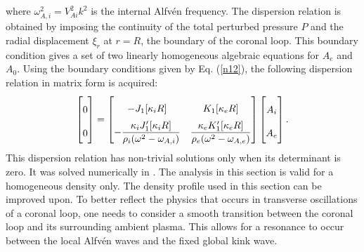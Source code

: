 \documentclass[12pt,a4paper,twoside]{article}
\newcommand{\Alfven}{Alfv\'{e}n }
\begin{document}
where $\omega^2_{A,i} = V^2_{Ai} k^2$ is the internal \Alfven frequency. The dispersion relation is obtained by imposing the continuity of the total perturbed pressure $P$ and the radial displacement $\xi_r$ at $r=R$, the boundary of the coronal loop. This boundary condition gives a set of two linearly homogeneous algebraic equations for $A_e$ and $A_0$. Using the boundary conditions given by Eq. (\ref{n12}), the following dispersion relation in matrix form is acquired: 
\begin{equation} \label{n11}
\def\arraystretch{2}
\begin{bmatrix}
    0 \\
    0 
  \end{bmatrix} =
  \begin{bmatrix}
    -J_1[ \kappa_i R] & K_1[\kappa_e R] \\
    -\dfrac{\kappa_i J_{1}^{\prime}[\kappa_i R]}{\rho_i(\omega^2-\omega_{A,i})} & \dfrac{\kappa_e K_{1}^{\prime}[\kappa_e R]}{\rho_e(\omega^2-\omega_{A,e})}  
  \end{bmatrix}
   \begin{bmatrix}
  A_i \\
  A_e 
  \end{bmatrix} .
\end{equation}
This dispersion relation has non-trivial solutions only when its determinant is zero. It was solved numerically in \cite{Yuan_2016}. The analysis in this section is valid for a homogeneous density only. The density profile used in this section can be improved upon. To better reflect the physics that occurs in transverse oscillations of a coronal loop, one needs to consider a smooth transition between the coronal loop and its surrounding ambient plasma. This allows for a resonance to occur between the local \Alfven waves and the fixed global kink wave.  \\ \\
\end{document}
